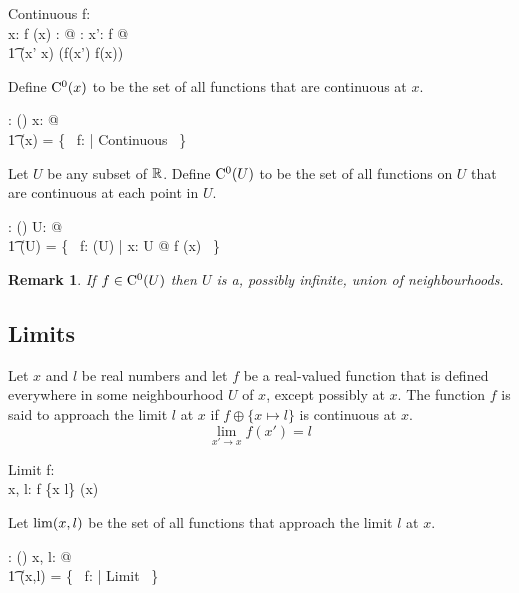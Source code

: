 \documentclass[11pt, oneside]{article}
\newtheorem*{remark}{Remark}
\begin{document}
\begin{schema}{Continuous}
	f: \R \pfun \R \\
	x: \R
\where
	f \in \FunR(x)
\also
	\forall \epsilon: \Rpos @ \exists \delta: \Rpos@ \forall x': \dom f @ \\
	\t1	\absR(x' \subR x) \ltR \delta \implies \absR(f(x') \subR f(x)) \ltR \epsilon
\end{schema}

Define $\operatorname{C^0}(x)$ to be the set of all functions that are continuous at $x$.
\begin{axdef}
	\CzeroR: \R \fun \power(\R \pfun \R)
\where
	\forall x: \R @ \\
	\t1	\CzeroR(x) = \{~ f: \R \pfun \R | Continuous ~\}
\end{axdef}

Let $U$ be any subset of $\mathbb{R}$. 
Define $\operatorname{C^0}(U)$ to be the set of all functions on $U$ that are continuous at each point in $U$.
\begin{axdef}
	\CzeroPR: \power \R \fun \power (\R \pfun \R)
\where
	\forall U: \power \R @ \\
	\t1	\CzeroPR(U) = \{~ f: \FunPR(U) | \forall x: U @ f \in   \CzeroR(x) ~\}
\end{axdef}

\begin{remark}
If $f \in \operatorname{C^0}(U)$ then $U$ is a, possibly infinite, union of neighbourhoods.
\end{remark}

\subsection{Limits}

Let $x$ and $l$ be real numbers and
let $f$ be a real-valued function that is defined everywhere in some
neighbourhood $U$ of $x$, except possibly at $x$.
The function $f$ is said to approach the limit $l$ at $x$ if $f \oplus \{ x \mapsto l \}$ is continuous at $x$.
$$
	\lim_{x' \to x}{f(x')} = l
$$

\begin{schema}{Limit}
	f: \R \pfun \R \\
	x, l: \R
\where
	f \oplus \{x \mapsto l\} \in \CzeroR(x)
\end{schema}

Let $\operatorname{lim}(x,l)$ be the set of all functions that approach the limit $l$ at $x$.
\begin{axdef}
	\limRR: \R \cross \R \fun \power(\R \pfun \R)
\where
	\forall x, l: \R @ \\
	\t1	\limRR(x,l) = \{~ f: \R \pfun \R | Limit ~\}
\end{axdef}
\end{document}
